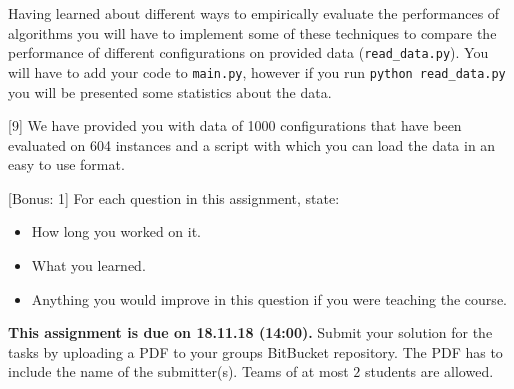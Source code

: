 \documentclass{exam}
\newcommand{\duedate}{18.11.18 (14:00)}
\newcommand{\due}{{\bf This assignment is due on \duedate.} }
\begin{document}
	\gccs
	
	Having learned about different ways to empirically evaluate the performances of algorithms you will have to implement some of these techniques to compare the performance of different configurations on provided data (\texttt{read\_data.py}). You will have to add your code to \texttt{main.py}, however if you run \texttt{python read\_data.py} you will be presented some statistics about the data.
	\begin{questions}
		[9]
		We have provided you with data of 1000 configurations that have been evaluated on 604 instances and a script with which you can load the data in an easy to use format.
	
	[Bonus: 1]
	For each question in this assignment, state:
	\begin{itemize}
	\item How long you worked on it.
	\item What you learned.
	\item Anything you would improve in this question if you were teaching the course.
	\end{itemize}
	\end{questions}
	
	\noindent
	\due Submit your solution for the tasks by uploading a PDF to your groups BitBucket repository. The PDF has to include the name of the submitter(s). Teams of at most $2$ students are allowed.
\end{document}
